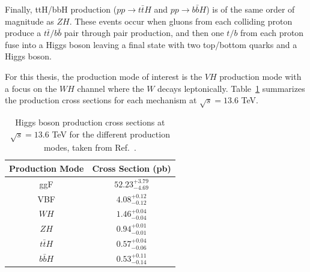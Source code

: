 Finally, ttH/bbH production ($pp \rightarrow t\bar{t}H$ and $pp \rightarrow b\bar{b}H$) is of the same order of magnitude as $ZH$. These events occur when gluons from each colliding proton produce a $t\bar{t} \slash b\bar{b}$ pair through pair production, and then one $t \slash b$ from each proton fuse into a Higgs boson leaving a final state with two top/bottom quarks and a Higgs boson. 

For this thesis, the production mode of interest is the $VH$ production mode with a focus on the $WH$ channel where the $W$ decays leptonically. Table~\ref{tab:higgs_production_cross_sections} summarizes the production cross sections for each mechanism at $\sqrt{s} = 13.6$ TeV.

\begin{table}
  \centering
  \begin{tabular}{c|c}
    \hline
    Production Mode & Cross Section (pb) \\
    \hline
    ggF & $52.23^{+3.79}_{-4.69}$ \\
    VBF & $4.08^{+0.12}_{-0.12}$ \\
    $WH$ & $1.46^{+0.04}_{-0.04}$ \\
    $ZH$ & $0.94^{+0.01}_{-0.01}$ \\
    $t\bar{t}H$ & $0.57^{+0.04}_{-0.06}$ \\
    $b\bar{b}H$ & $0.53^{+0.11}_{-0.14}$ \\
    \hline
  \end{tabular}
  \caption{Higgs boson production cross sections at $\sqrt{s} = 13.6$ TeV for the different production modes, taken from Ref.~\cite{Higgs_production_cross_sections}.}\label{tab:higgs_production_cross_sections}
\end{table}